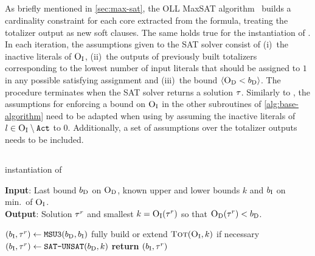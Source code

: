 \subsection{\oll{}\label{sec:oll}}

As briefly mentioned in \cref{sec:max-sat}, the OLL MaxSAT algorithm~\autocite{DBLP:conf/cp/MorgadoDM14} builds a cardinality constraint for each core extracted from the formula, treating the totalizer output as new soft clauses.
The same holds true for the \oll{} instantiation of \Min{}.
In each iteration, the assumptions given to the SAT solver consist of (i)~the inactive literals of $\textsc{O}_{\text{I}}$, (ii)~the outputs of previously built totalizers corresponding to the lowest number of input literals that should be assigned to $1$ in any possible satisfying assignment and (iii)~the bound $\langle \textsc{O}_{\text{D}} < b_{\text{D}} \rangle$.
The procedure terminates when the SAT solver returns a solution $\tau$.
Similarly to \msu{}, the assumptions for enforcing a bound on $\textsc{O}_{\text{I}}$ in the other subroutines of \cref{alg:base-algorithm} need to be adapted when using \oll{} by assuming the inactive literals of $l \in \textsc{O}_{\text{I}} \setminus \texttt{Act}$ to $0$.
Additionally, a set of assumptions over the totalizer outputs needs to be included.


\subsection{\msh{}\label{sec:hybrid}}

\begin{algorithm}[t]
  \caption{\msh{} instantiation of \Min{}}\label{alg:msh}
  \textbf{Input}: Last bound $b_{\text{D}}$ on $\textsc{O}_{\text{D}}$, known upper and lower bounds $k$ and $b_{\text{I}}$ on min.\ of $\textsc{O}_{\text{I}}$. \\
  \textbf{Output}: Solution $\tau^r$ and smallest $k=\textsc{O}_{\text{I}}(\tau^r)$ so that $\textsc{O}_{\text{D}}(\tau^r)<b_{\text{D}}$.

  \begin{algorithmic}[1]
    \IF{$|\Act| < \thr \cdot |\Obj_\inc|$}
      \STATE $(b_{\text{I}},\tau^r) \gets \texttt{MSU3}{}(b_{\text{D}}, b_{\text{I}})$  \label{ln:msh-msu}
    \ENDIF
    \IF{$|\Act| \ge \thr \cdot |\Obj_\inc|$}
      \STATE fully build or extend $\textsc{Tot}(\textsc{O}_{\text{I}}, k)$ if necessary \label{ln:msh-tot}
      \STATE $(b_{\text{I}},\tau^r) \gets \texttt{SAT-\allowbreak{}UNSAT}{}(b_{\text{D}}, k)$ \label{ln:msh-su}
    \ENDIF
    \STATE \textbf{return} $(b_{\text{I}},\tau^r)$ \label{ln:msh-ret}
  \end{algorithmic}
\end{algorithm}

